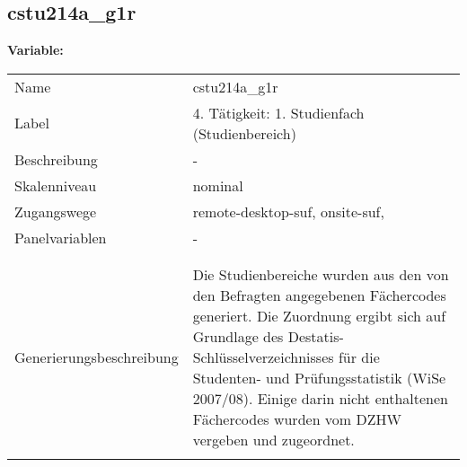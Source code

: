	
	
	\subsection{cstu214a\_g1r}
	\label{subSection:cstu214a_g1r}

	\noindent\textbf{Variable:}\\
		\begin{tabular}{lL{11.3cm}}
			\label{tableVariable:cstu214a_g1r}
			Name & cstu214a\_g1r \\
			Label & 4. Tätigkeit: 1. Studienfach (Studienbereich) \\
			Beschreibung & - \\
			Skalenniveau & nominal \\
			Zugangswege &
				remote-desktop-suf,
				onsite-suf,
 \\
			Panelvariablen & -
			 \\
			 \\
 \\
					Generierungsbeschreibung & Die Studienbereiche wurden aus den von den Befragten angegebenen Fächercodes generiert. Die Zuordnung ergibt sich auf Grundlage des Destatis-Schlüsselverzeichnisses für die Studenten- und Prüfungsstatistik (WiSe 2007/08). Einige darin nicht enthaltenen Fächercodes wurden vom DZHW vergeben und zugeordnet. 
				 \\	
			 \\
		\end{tabular}







